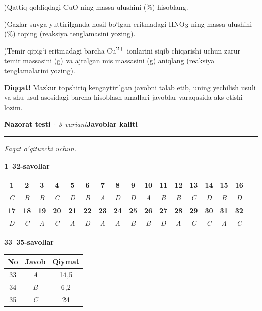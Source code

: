 \documentclass[11pt,a4paper]{article}
\renewcommand{\textsubscript}[1]{\ensuremath{_{\text{\fontsize{8}{8}\selectfont #1}}}}
\renewcommand{\textsuperscript}[1]{\ensuremath{^{\text{\fontsize{8}{8}\selectfont #1}}}}
\newcommand{\diqqat}[1]{\par\smallskip\noindent\textbf{Diqqat!} #1\par\medskip}
\begin{document}
)Qattiq qoldiqdagi CuO ning massa ulushini (\%) hisoblang.\par
{})Gazlar suvga yuttirilganda hosil bo`lgan eritmadagi HNO\textsubscript{3} ning massa ulushini (\%) toping (reaksiya tenglamasini yozing).\par
{})Temir qipig`i eritmadagi barcha Cu\textsuperscript{2+} ionlarini siqib chiqarishi uchun zarur temir massasini (g) va ajralgan mis massasini (g) aniqlang (reaksiya tenglamalarini yozing).\par
\diqqat{Mazkur topshiriq kengaytirilgan javobni talab etib, uning yechilish usuli va shu usul asosidagi barcha hisoblash amallari javoblar varaqasida aks etishi lozim.}
\newpage
\noindent\textbf{\fontsize{13}{15}\selectfont Nazorat testi}\ \textit{$\cdot$ 3-variant}\hfill \textbf{Javoblar kaliti}\par\smallskip\hrule\smallskip
\textit{Faqat o`qituvchi uchun.}\par\medskip
\noindent\textbf{1--32-savollar}\par\smallskip
\noindent\begin{tabular}{|c|c|c|c|c|c|c|c|c|c|c|c|c|c|c|c|}\hline
\textbf{1} & \textbf{2} & \textbf{3} & \textbf{4} & \textbf{5} & \textbf{6} & \textbf{7} & \textbf{8} & \textbf{9} & \textbf{10} & \textbf{11} & \textbf{12} & \textbf{13} & \textbf{14} & \textbf{15} & \textbf{16}\\\hline
\textsl{C} & \textsl{B} & \textsl{B} & \textsl{C} & \textsl{D} & \textsl{B} & \textsl{A} & \textsl{D} & \textsl{D} & \textsl{A} & \textsl{B} & \textsl{B} & \textsl{C} & \textsl{D} & \textsl{B} & \textsl{D}\\\hline
\textbf{17} & \textbf{18} & \textbf{19} & \textbf{20} & \textbf{21} & \textbf{22} & \textbf{23} & \textbf{24} & \textbf{25} & \textbf{26} & \textbf{27} & \textbf{28} & \textbf{29} & \textbf{30} & \textbf{31} & \textbf{32}\\\hline
\textsl{D} & \textsl{C} & \textsl{A} & \textsl{C} & \textsl{A} & \textsl{D} & \textsl{A} & \textsl{A} & \textsl{B} & \textsl{B} & \textsl{D} & \textsl{A} & \textsl{C} & \textsl{C} & \textsl{A} & \textsl{C}\\\hline
\end{tabular}\par\medskip
\noindent\textbf{33--35-savollar}\par\smallskip
\noindent\begin{tabular}{|c|c|c|}\hline \textbf{No} & \textbf{Javob} & \textbf{Qiymat}\\\hline
33 & \textsl{A} & 14,5\\\hline
34 & \textsl{B} & 6,2\\\hline
35 & \textsl{C} & 24\\\hline
\end{tabular}\par\medskip
\end{document}
